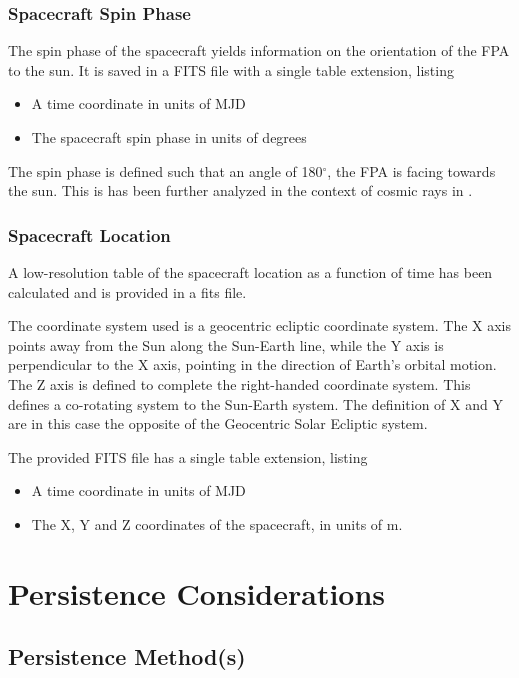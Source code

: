 \documentclass[a4paper, 11pt]{article}
\begin{document}
\subsubsection{Spacecraft Spin Phase}
The spin phase of the spacecraft yields information on the orientation of the FPA to the sun. It is saved in a FITS file with a single table extension, listing
\begin{itemize}
  \item A time coordinate in units of MJD
  \item The spacecraft spin phase in units of degrees
\end{itemize}

The spin phase is defined such that an angle of 180$^{\circ}$, the FPA is facing towards the sun. This is has been further analyzed in the context of cosmic rays in \cite{GAIA-CA-TN-ESAC-AAA-035-1}.

\subsubsection{Spacecraft Location}
A low-resolution table of the spacecraft location as a function of time has been calculated and is provided in a fits file.

The coordinate system used is a geocentric ecliptic coordinate system. The X axis points away from the Sun along the Sun-Earth line, while the Y axis is perpendicular to the X axis, pointing in the direction of Earth's orbital motion. The Z axis is defined to complete the right-handed coordinate system. This defines a co-rotating system to the Sun-Earth system. The definition of X and Y are in this case the opposite of the Geocentric Solar Ecliptic system. 

The provided FITS file has a single table extension, listing
\begin{itemize}
  \item A time coordinate in units of MJD
  \item The X, Y and Z coordinates of the spacecraft, in units of m.
\end{itemize}


\section{Persistence Considerations}
\label{sec:persist}
\subsection{Persistence Method(s)}
\end{document}
